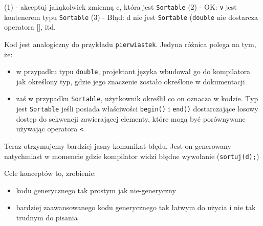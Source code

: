 \documentclass[11pt, a4paper]{article}
\begin{document}
\noindent (1) - akceptuj jakąkolwiek zmienną c, która jest \verb#Sortable# \newline
(2) - OK: \verb#v# jest kontenerem typu \verb#Sortable# \newline
(3) - Błąd: d nie jest \verb#Sortable# (\verb#double# nie dostarcza operatora [], itd. \newline

Kod jest analogiczny do przykładu \verb#pierwiastek#. Jedyna różnica polega na tym, że:
\begin{itemize}

\item w przypadku typu \verb#double#, projektant języka wbudował go do kompilatora jak określony typ, gdzie jego znaczenie zostało określone w dokumentacji

\item zaś w przypadku \verb#Sortable#, użytkownik określił co on oznacza w kodzie. Typ jest \verb#Sortable# jeśli posiada właściwości \verb#begin()# i \verb#end()# dostarczające losowy dostęp do sekwencji zawierającej elementy, które mogą być porównywane używając operatora \verb#<#

\end{itemize}

Teraz otrzymujemy bardziej jasny komunikat błędu. Jest on generowany natychmiast w momencie gdzie kompilator widzi błędne wywołanie (\verb#sortuj(d);#)

Cele konceptów to, zrobienie:
\begin{itemize}

\item kodu generycznego tak prostym jak nie-generyczny

\item bardziej zaawansowanego kodu generycznego tak łatwym do użycia i nie tak trudnym do
pisania

\end{itemize}
\end{document}
